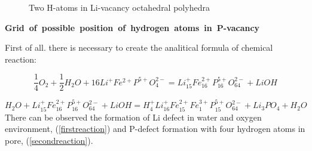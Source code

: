\begin{figure}[h]
\begin{minipage}[h]{1\linewidth}
\end{minipage}
\caption{ Two H-atoms in Li-vacancy octahedral polyhedra}
\label{livac}
\end{figure}

\noindent\mbox{\textbf{Grid of possible position of hydrogen atoms in P-vacancy}}

First of all. there is necessary to create the analitical formula of chemical reaction:

\begin{equation}
\frac{1}{4}O_2 + \frac{1}{2}H_2O + 16 Li^{+}Fe^{2+}P^{5+}O^{2-}_4 = Li^{+}_{15}Fe^{2+}_{16}P^{5+}_{16}O^{2-}_{64} + LiOH
\label{firstreaction}
\end{equation}

\begin{equation}
H_2O + Li^{+}_{15}Fe^{2+}_{16}P^{5+}_{16}O^{2-}_{64} + LiOH = H^{+}_{4}Li^{+}_{16}Fe^{2+}_{15}Fe^{3+}_{1}P^{5+}_{15}O^{2-}_{64} + Li_3PO_4 + H_2O
\label{secondreaction}
\end{equation}
There can be observed the formation of Li defect in water and oxygen environment, (\ref{firstreaction}) and P-defect formation with four hydrogen atoms in pore, (\ref{secondreaction}).

